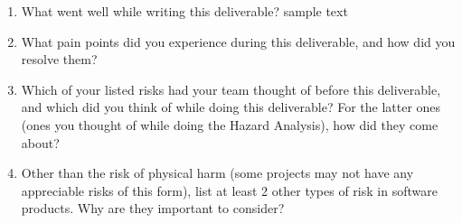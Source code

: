 \documentclass{article}
\begin{document}
\begin{enumerate}
    \item What went well while writing this deliverable? sample text
    \item What pain points did you experience during this deliverable, and how
    did you resolve them?
    \item Which of your listed risks had your team thought of before this
    deliverable, and which did you think of while doing this deliverable? For
    the latter ones (ones you thought of while doing the Hazard Analysis), how
    did they come about?
    \item Other than the risk of physical harm (some projects may not have any
    appreciable risks of this form), list at least 2 other types of risk in
    software products. Why are they important to consider?
\end{enumerate}
\end{document}
